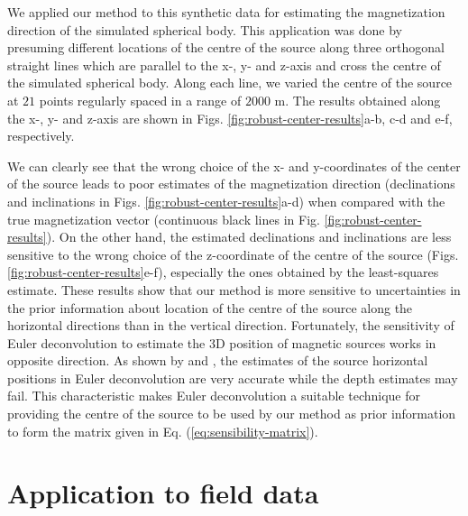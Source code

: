 \documentclass[journal abbreviation, npg]{copernicus}
\begin{document}
We applied our method to this synthetic data for estimating the magnetization direction of the simulated spherical body. This application was done by presuming different locations of the centre of the source along three orthogonal straight lines which are parallel to the x-, y- and z-axis and cross the centre of the simulated spherical body. Along each line, we varied the centre of the source at $21$ points regularly spaced in a range of $2000$ m. The results obtained along the  x-, y- and z-axis are shown in Figs. \ref{fig:robust-center-results}a-b, c-d and e-f, respectively.

We can clearly see that the wrong choice of the x- and y-coordinates of the center of the source leads to poor estimates of the magnetization direction (declinations and inclinations in Figs. \ref{fig:robust-center-results}a-d) when compared with the true magnetization vector (continuous black lines in Fig. \ref{fig:robust-center-results}). On the other hand, the estimated declinations and inclinations are less sensitive to the wrong choice of the z-coordinate of the centre of the source (Figs. \ref{fig:robust-center-results}e-f), especially the ones obtained by the least-squares estimate. These results show that our method is more sensitive to uncertainties in the prior information about location of the centre of the source along the horizontal directions than in the vertical direction. Fortunately, the sensitivity of Euler deconvolution to estimate the 3D position of magnetic sources works in opposite direction. As shown by \citet{silva-barbosa2003} and \citet{melo-etal2013}, the estimates of the source horizontal positions in Euler deconvolution are very accurate while the depth estimates may fail. This characteristic makes Euler deconvolution a suitable technique for providing the centre of the source to be used by our method as prior information to form the matrix given in Eq. (\ref{eq:sensibility-matrix}).

\section{Application to field data}
\end{document}
